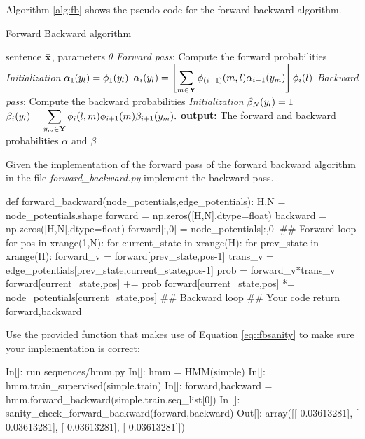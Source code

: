 Algorithm \ref{alg:fb} shows the pseudo code for the forward backward algorithm.

\begin{algorithm}[t]
   \caption{Forward Backward algorithm \label{alg:fb}}
\begin{algorithmic}[1]
    sentence $\bar{\mathbf{x}}$, parameters $\theta$
        \STATE  \emph{Forward pass}: Compute the forward probabilities
        \STATE \emph{Initialization}
        \STATE $\alpha_1({y}_l) = \phi_1({y}_l)$
        \ENDFOR 
                 \STATE $\alpha_i({y}_l) = \left[ \displaystyle
                   \sum_{m  \in \mathbf{Y}} \phi_{(i-1)}(m,l)
                   \alpha_{i-1}({y}_m) \right] \phi_i(l)$
         \ENDFOR 
        \ENDFOR 
       \STATE \emph{Backward pass}: Compute the backward probabilities
       \STATE \emph{Initialization}
        \STATE $\beta_N({y}_l) = 1$
        \ENDFOR 
        \STATE $\beta_i({y}_l) = \displaystyle \sum_{{y}_m \in \mathbf{Y}} \phi_i(l,m)\phi_{i+1}(m) \beta_{i+1}({y}_m).$
        \ENDFOR 
       \STATE \textbf{output:} The forward and backward probabilities
       $\alpha$ and $\beta$
\end{algorithmic}
\end{algorithm}



\begin{exercise}
Given the implementation of the forward pass of the forward backward
algorithm in the file \emph{forward\_backward.py} implement the backward pass.
\begin{python}

def forward_backward(node_potentials,edge_potentials):
    H,N = node_potentials.shape
    forward = np.zeros([H,N],dtype=float)
    backward = np.zeros([H,N],dtype=float)
    forward[:,0] = node_potentials[:,0]
    ## Forward loop
    for pos in xrange(1,N):
        for current_state in xrange(H):
            for prev_state in xrange(H):
                forward_v = forward[prev_state,pos-1]
                trans_v = edge_potentials[prev_state,current_state,pos-1]
                prob = forward_v*trans_v
                forward[current_state,pos] += prob
            forward[current_state,pos] *= node_potentials[current_state,pos]
    ## Backward loop
          ## Your code
   return forward,backward

\end{python}

Use the provided function that makes use of Equation \ref{eq::fbsanity} to make
sure your implementation is correct:
 
\begin{python}
In[]:  run sequences/hmm.py
In[]: hmm = HMM(simple)
In[]: hmm.train_supervised(simple.train)
In[]: forward,backward =  hmm.forward_backward(simple.train.seq_list[0])
In []: sanity_check_forward_backward(forward,backward)
Out[]: 
array([[ 0.03613281],
       [ 0.03613281],
       [ 0.03613281],
       [ 0.03613281]])
\end{python}
\end{exercise}

